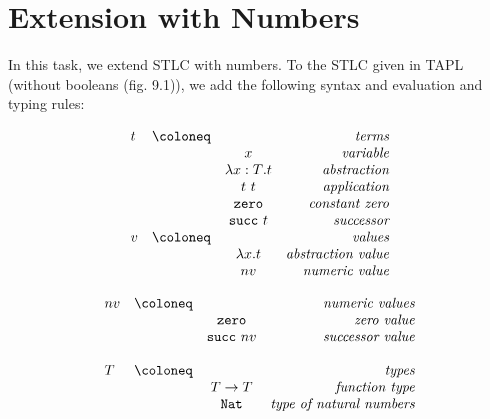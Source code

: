 \section{Extension with Numbers}
In this task, we extend STLC with numbers.
To the STLC given in TAPL (without booleans (fig. 9.1)), we add the following syntax and evaluation and typing rules:\\
\begin{minipage}{0.45\textwidth}
  \[ 
  \begin{array}{lccr}
    t  & \coloneq  &                  &\emph{terms}\\
    &           & {x}              &\emph{variable}\\
    &           & \lambda{x:T}.t   &\emph{abstraction}\\
    &           & {t~t}            &\emph{application}\\
    &           & \mathtt{zero}    &\emph{constant zero}\\
    &           & \mathtt{succ}~t  &\emph{successor}\\ 
    v  & \coloneq  &                  &\emph{values} \\
    &           & \lambda{x}.t     &\emph{abstraction value}\\
    &           & nv               &\emph{numeric value}\\
  \end{array}
  \]
\end{minipage}
\hfill
\begin{minipage}{0.45\textwidth}
  \[
    \begin{array}{lccr}
      nv & \coloneq  &                  &\emph{numeric values}\\
      &           & \mathtt{zero}    &\emph{zero value}\\
      &           & \mathtt{succ}~nv &\emph{successor value}\\
      \\
      T  & \coloneq  &                  &\emph{types}\\
      &           & T \rightarrow T  &\emph{function type} \\
      &           & \mathtt{Nat}     &\emph{type of natural numbers} \\
    \end{array}
  \]
\end{minipage}
\hfill
\vspace{1em}

